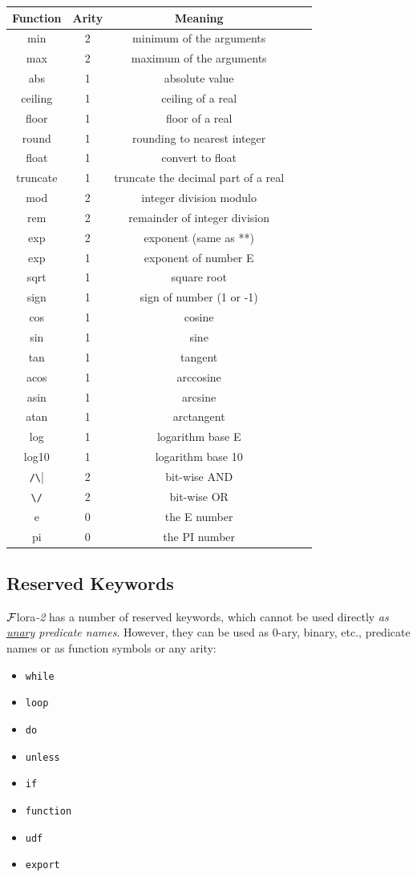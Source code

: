 \documentclass[11pt]{article}
\newcommand{\FLORA}{{\mbox{\sc ${\cal F}${lora}\rm\emph{-2}}}\xspace}
\begin{document}
\begin{tabular}{|c|c|c|c|c|}
\hline
Function  & Arity & Meaning  \\ \hline
min & 2 & minimum of the arguments\\
max & 2 & maximum of the arguments\\
abs & 1 & absolute value \\
ceiling & 1 & ceiling of a real \\
floor & 1 & floor of a real \\
round & 1 & rounding to nearest integer \\
float & 1 & convert to float \\
truncate & 1 & truncate the decimal part of a real \\
mod & 2 & integer division modulo \\
rem & 2 & remainder of integer division\\
exp & 2 & exponent (same as **)\\
exp & 1 & exponent of number E\\
sqrt & 1 & square root\\
sign & 1 & sign of number (1 or -1)\\
cos & 1 & cosine \\
sin & 1 & sine \\
tan & 1 & tangent \\
acos & 1 & arccosine\\ 
asin & 1 & arcsine\\ 
atan & 1 & arctangent\\ 
log & 1 & logarithm base E \\
log10 & 1 & logarithm base 10 \\
\verb|/\| & 2 & bit-wise AND \\
\verb|\/| & 2 & bit-wise OR \\
e & 0 & the E number\\
pi & 0 & the PI number\\
\hline
\end{tabular}

\subsection{Reserved Keywords}

\FLORA has a number of reserved keywords, which cannot be used directly \emph{as
\underline{unary} predicate names}. However, they can be used as 0-ary,
binary, etc., predicate names or as function symbols or any arity:
\begin{itemize}
\item  \texttt{while}
\item \texttt{loop}
\item \texttt{do}
\item \texttt{unless}
\item \texttt{if}
\item \texttt{function}
\item \texttt{udf}
\item \texttt{export}
\end{itemize}
\end{document}
